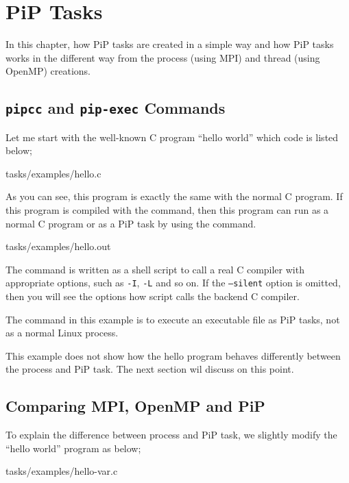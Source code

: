 
\section{PiP Tasks}

In this chapter, how PiP tasks are created in a simple way and how PiP
tasks works in the different way from the process (using MPI) and
thread (using OpenMP) creations.

\subsection{{\tt pipcc} and {\tt pip-exec} Commands}

Let me start with the well-known C program ``hello world'' which code
is listed below;


                {tasks/examples/hello.c}

As you can see, this program is exactly the same with the normal C
program. If this program is compiled with the  command,
then this program can run as a normal C program or as a PiP task by
using the  command.


                {tasks/examples/hello.out}

The  command is written as a shell script to call a real
C compiler with appropriate options, such as {\tt -I}, {\tt -L} and so
on. If the {\tt --silent} option is omitted, then you will see the
options how  script calls the backend C compiler.

The  command in this example is to execute an
executable file as PiP tasks, not as a normal Linux process.

This example does not show how the hello program behaves differently
between the process and PiP task. The next section wil discuss on this
point.

\subsection{Comparing MPI, OpenMP and PiP}

To explain the difference between process and PiP task, we slightly
modify the ``hello world'' program as below;

 {tasks/examples/hello-var.c}

